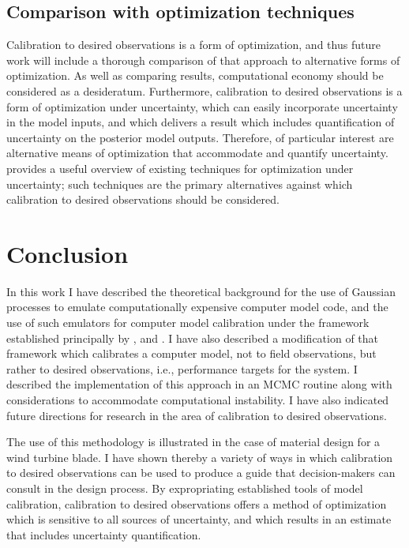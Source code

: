 \documentclass{article}
\begin{document}
\subsection{Comparison with optimization techniques}

Calibration to desired observations is a form of optimization, and thus future work will include a thorough comparison of that approach to alternative forms of optimization. As well as comparing results, computational economy should be considered as a desideratum. Furthermore, calibration to desired observations is a form of optimization under uncertainty, which can easily incorporate uncertainty in the model inputs, and which delivers a result which includes quantification of uncertainty on the posterior model outputs. Therefore, of particular interest are alternative means of optimization that accommodate and quantify uncertainty. \cite{Sahinidis2004} provides a useful overview of existing techniques for optimization under uncertainty; such techniques are the primary alternatives against which calibration to desired observations should be considered.

\section{Conclusion}

In this work I have described the theoretical background for the use of Gaussian processes to emulate computationally expensive computer model code, and the use of such emulators for computer model calibration under the framework established principally by \cite{Kennedy2001}, \cite{Williams2006} and \cite{Bayarri2007}. I have also described a modification of that framework which calibrates a computer model, not to field observations, but rather to desired observations, i.e., performance targets for the system. I described the implementation of this approach in an MCMC routine along with considerations to accommodate computational instability. I have also indicated future directions for research in the area of calibration to desired observations.

The use of this methodology is illustrated in the case of material design for a wind turbine blade. I have shown thereby a variety of ways in which calibration to desired observations can be used to produce a guide that decision-makers can consult in the design process. By expropriating established tools of model calibration, calibration to desired observations offers a method of optimization which is sensitive to all sources of uncertainty, and which results in an estimate that includes uncertainty quantification.






\pagebreak


\end{document}
